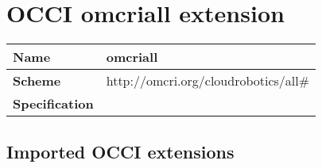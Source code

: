 \section{OCCI omcriall extension}
\begin{center}
\begin{tabular}{|l|l|}
  \hline
  \textbf{Name} & omcriall \\
  \hline  
  \textbf{Scheme} & http://omcri.org/cloudrobotics/all\# \\
  \hline
  \textbf{Specification} &  \\
  \hline
\end{tabular}
\end{center}

\subsection{Imported OCCI extensions}

